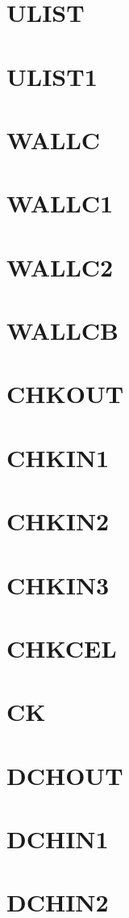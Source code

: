 \documentclass[10pt,UTF8]{ctexbook}
\begin{document}
\section{ULIST}
\section{ULIST1}
\section{WALLC}
\section{WALLC1}
\section{WALLC2}
\section{WALLCB}
\section{CHKOUT}
\section{CHKIN1}
\section{CHKIN2}
\section{CHKIN3}
\section{CHKCEL}
\section{CK}
\section{DCHOUT}
\section{DCHIN1}
\section{DCHIN2}
\end{document}
